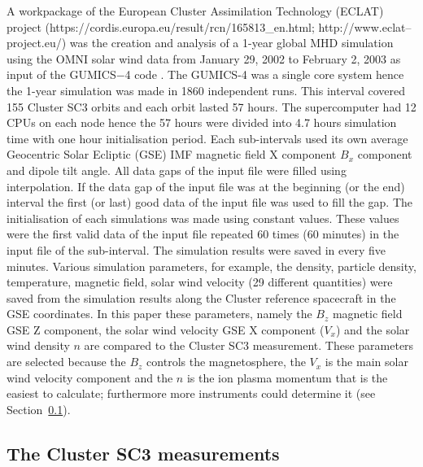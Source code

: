 \documentclass[linenumbers,draft]{agujournal}
\begin{document}
A workpackage of the European Cluster Assimilation Technology (ECLAT) project (https://cordis.europa.eu/result/rcn/165813\_en.html; http://www.eclat--project.eu/) was the creation and analysis of a 1-year global MHD simulation using the OMNI solar wind data  from January 29, 2002 to February 2, 2003 as input of the GUMICS$-$4 code \citep{facsko16:_one_earth}. The GUMICS-4 was a single core system \citep{janhunen12:_gumic_mhd} hence the 1-year simulation was made in 1860 independent runs. This interval covered 155 Cluster SC3 orbits and each orbit lasted 57 hours. The supercomputer had 12 CPUs on each node hence the 57 hours were divided into 4.7 hours simulation time with one hour initialisation period. Each sub-intervals used its own average Geocentric Solar Ecliptic (GSE) IMF magnetic field X component $B_x$ component and dipole tilt angle. All data gaps of the input file were filled using interpolation. If the data gap of the input file was at the beginning (or the end) interval the first (or last) good data of the input file was used to fill the gap. The initialisation of each simulations was made using constant values. These values were the first valid data of the input file repeated 60 times (60 minutes) in the input file of the sub-interval. The simulation results were saved in every five minutes. Various simulation parameters, for example, the density, particle density, temperature, magnetic field, solar wind velocity (29 different quantities) were saved from the simulation results along the Cluster reference spacecraft in the GSE coordinates. In this paper these parameters, namely the $B_z$ magnetic field GSE Z component, the solar wind velocity GSE X component ($V_x$) and the solar wind density $n$ are compared to the Cluster SC3 measurement. These parameters are selected because the $B_z$ controls the magnetosphere, the $V_x$ is the main solar wind velocity component and the $n$ is the ion plasma momentum that is the easiest to calculate; furthermore more instruments could determine it (see Section~\ref{sec:cluster}).

\subsection{The Cluster SC3 measurements}
\label{sec:cluster}
\end{document}
